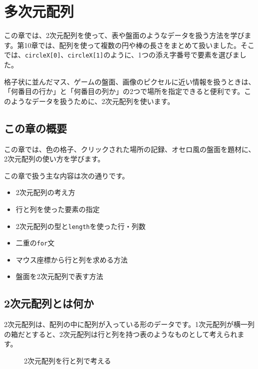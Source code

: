 \chapter{多次元配列}
\label{chap:multidimensional-arrays}

この章では、2次元配列を使って、表や盤面のようなデータを扱う方法を学びます。第10章では、配列を使って複数の円や棒の長さをまとめて扱いました。そこでは、\texttt{circleX[0]}、\texttt{circleX[1]}のように、1つの添え字番号で要素を選びました。

格子状に並んだマス、ゲームの盤面、画像のピクセルに近い情報を扱うときは、「何番目の行か」と「何番目の列か」の2つで場所を指定できると便利です。このようなデータを扱うために、2次元配列を使います。

\section{この章の概要}

この章では、色の格子、クリックされた場所の記録、オセロ風の盤面を題材に、2次元配列の使い方を学びます。

この章で扱う主な内容は次の通りです。

\begin{itemize}
    \item 2次元配列の考え方
    \item 行と列を使った要素の指定
    \item 2次元配列の型と\texttt{length}を使った行・列数
    \item 二重の\texttt{for}文
    \item マウス座標から行と列を求める方法
    \item 盤面を2次元配列で表す方法
\end{itemize}

\section{2次元配列とは何か}

2次元配列は、配列の中に配列が入っている形のデータです。1次元配列が横一列の箱だとすると、2次元配列は行と列を持つ表のようなものとして考えられます。

\begin{figure}[htbp]
    \centering
    \caption{2次元配列を行と列で考える}
    \label{fig:chapter13-row-column}
\end{figure}

